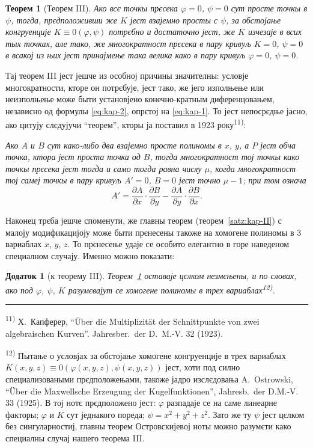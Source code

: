 \documentclass[11pt]{article}
\newcommand{\foreign}[1]{#1}
\theoremstyle{plain}
\newtheorem{satz}{Теорем}
\newtheorem{zusatz}{Додаток}
\begin{document}
\begin{satz}[Теорем III]\label{satz:kap-III}
Ако всє точкы прєсека $\varphi = 0$, $\psi = 0$ сут просте точкы в
$\psi$, тогда, прєдположивши же $K$ јест взајемно просты с $\psi$,
за обстојање конгруенције $K \equiv 0(\varphi, \psi)$ потрєбно и
достаточно јест, же $K$ изчезаје в всих тых точках, але тако, же
многократност прєсека в пару кривуљ $K = 0$, $\psi = 0$ в всакој
из њих јест принајмење така велика како в пару кривуљ
$\varphi = 0$, $\psi = 0$.
\end{satz}

Тај теорем III јест јешче из особној причины значителны: условје
многократности, кторе он потрєбује, јест тако, же јего изполњење
или неизполњење може быти установјено конечно-кратным
диференцовањем, независно од формулы \eqref{eq:kap-2}, опрєтој на
\eqref{eq:kap-1}. То јест непосрєдње јасно, ако цитују слєдујучи
``теорем'', кторы ја поставил в 1923 року\textsuperscript{11)}:

\smallskip
\textit{Ако $A$ и $B$ сут како-либо два взајемно просте полиномы в
$x$, $y$, а $P$ јест обча точка, ктора јест проста точка од $B$,
тогда многократност тој точкы како точкы прєсека јест тогда и само
тогда равна числу $\mu$, когда многократност тој самеј точкы в пару
кривуљ $A' = 0$, $B = 0$ јест точно $\mu - 1$; при том означа}
\[
A' = \frac{\partial A}{\partial x} \cdot \frac{\partial B}{\partial y} -
\frac{\partial A}{\partial y} \cdot \frac{\partial B}{\partial x}.
\]

Наконец трєба јешче споменути, же главны теорем
(теорем~\ref{satz:kap-II}) с малоју модификацијоју може быти
прєнесены такоже на хомогене полиномы в 3 вариаблах $x$, $y$, $z$.
То прєнесење удаје се особито елегантно в горе наведеном специалном
случају. Именно можно показати:

\begin{zusatz}[к теорему III]
Теорем~\ref{satz:kap-III} оставаје цєлком незмєњены, и по словах,
ако под $\varphi$, $\psi$, $K$ разумєвајут се хомогене полиномы в
трех вариаблах\textsuperscript{12)}.
\end{zusatz}

\vspace{0.5em}
\noindent\rule{\textwidth}{0.4pt}
\vspace{0.3em}

{\footnotesize
\textsuperscript{11)} Х.\ Капферер, ``\foreign{Über die Multiplizität der Schnittpunkte von zwei algebraischen
Kurven}''. \foreign{Jahresber.\ der D.\ M.-V.} 32 (1923).

\textsuperscript{12)} Пытање о условјах за обстојање хомогене конгруенције в
трех вариаблах $K(x,y,z) \equiv 0(\varphi(x,y,z), \psi(x,y,z))$ јест,
хоти под силно специализоваными прєдположењами, такоже јадро
изслєдовања \foreign{A.\ Ostrowski}, ``\foreign{Über die Maxwellsche Erzeugung der
Kugelfunktionen}'', \foreign{Jahresb.\ der D.M.-V.} 33 (1925). В тој
нотє прєдположено јест: $\varphi$ разпадаје се на саме линеарне
факторы; $\varphi$ и $K$ сут једнакого пореда; $\psi = x^{2} + y^{2} + z^{2}$.
Зато же ту $\psi$ јест цєлком без сингуларностиј, главны теорем
Островскијевој ноты можно разумєти како специалны случај нашего
теорема III.
}
\end{document}
